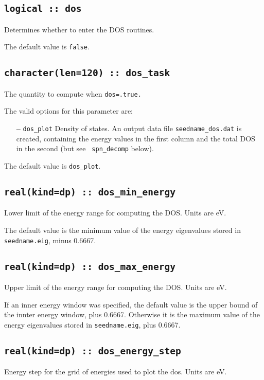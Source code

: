 \subsection[dos]{\tt logical :: dos}
Determines whether to enter the DOS routines.

The default value is \verb#false#.


\subsection[dos\_task]{\tt character(len=120) ::  dos\_task}
The quantity to compute when {\tt dos=.true.}

The valid options for this parameter are:
\begin{itemize}
\item[{\bf --}] \verb#dos_plot# Density of states. An output data file
  {\tt seedname\_dos.dat} is created, containing the energy values in
  the first column and the total DOS in the second (but see {\tt
    spn\_decomp} below).
\end{itemize}


The default value is \verb#dos_plot#.


\subsection[dos\_min\_energy]{\tt real(kind=dp) :: dos\_min\_energy}
Lower limit of the energy range for computing the DOS.
Units are eV.

The default value is the minimum value of the energy eigenvalues
stored in {\tt seedname.eig}, minus 0.6667.

\subsection[dos\_max\_energy]{\tt real(kind=dp) :: dos\_max\_energy}
Upper limit of the energy range for computing the DOS.
Units are eV.

If an inner energy window was specified, 
the default value is the upper bound of the innter energy window, plus 0.6667.
Otherwise it is  the maximum value of the energy eigenvalues
stored in {\tt seedname.eig}, plus 0.6667.

\subsection[dos\_energy\_step]{\tt real(kind=dp) :: dos\_energy\_step}
Energy step for the grid of energies used to plot the dos. Units are eV.


